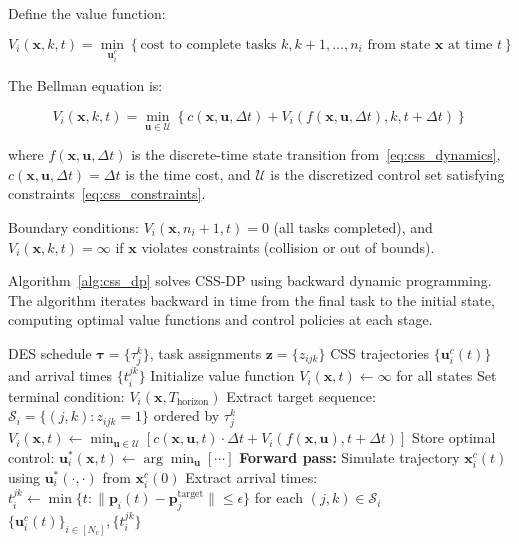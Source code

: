 \documentclass[manuscript,screen,review]{acmart}
\begin{document}
Define the value function:

\begin{equation}
V_i(\mathbf{x}, k, t) = \min_{\mathbf{u}_i^c} \left\{ \text{cost to complete tasks } k, k+1, \ldots, n_i \text{ from state } \mathbf{x} \text{ at time } t \right\}
\label{eq:css_value_function}
\end{equation}

The Bellman equation is:

\begin{equation}
V_i(\mathbf{x}, k, t) = \min_{\mathbf{u} \in \mathcal{U}} \left\{ c(\mathbf{x}, \mathbf{u}, \Delta t) + V_i(f(\mathbf{x}, \mathbf{u}, \Delta t), k, t + \Delta t) \right\}
\label{eq:css_bellman}
\end{equation}

where $f(\mathbf{x}, \mathbf{u}, \Delta t)$ is the discrete-time state
transition from~\eqref{eq:css_dynamics}, $c(\mathbf{x}, \mathbf{u}, \Delta t) = \Delta t$
is the time cost, and $\mathcal{U}$ is the discretized control set satisfying
constraints~\eqref{eq:css_constraints}.

Boundary conditions: $V_i(\mathbf{x}, n_i+1, t) = 0$ (all tasks completed),
and $V_i(\mathbf{x}, k, t) = \infty$ if $\mathbf{x}$ violates constraints
(collision or out of bounds).

Algorithm~\ref{alg:css_dp} solves CSS-DP using backward dynamic programming. 
The algorithm iterates backward in time from the final task to the initial 
state, computing optimal value functions and control policies at each stage.

\begin{algorithm}[t]
	\caption{CSS-DP: Continuous State Space Dynamic Programming}
	\label{alg:css_dp}
	\small
	\begin{algorithmic}[1]
		\Require DES schedule $\boldsymbol{\tau} = \{\tau_j^k\}$, task assignments $\mathbf{z} = \{z_{ijk}\}$
		\Ensure CSS trajectories $\{\mathbf{u}_i^c(t)\}$ and arrival times $\{t_i^{jk}\}$
		\State Initialize value function $V_i(\mathbf{x}, t) \leftarrow \infty$ for all states
		\State Set terminal condition: $V_i(\mathbf{x}, T_{\text{horizon}}) $
		\State Extract target sequence: $\mathcal{S}_i = \{(j,k): z_{ijk}=1\}$ ordered by $\tau_j^k$
		\State $V_i(\mathbf{x}, t) \leftarrow \min_{\mathbf{u} \in \mathcal{U}} \left[ c(\mathbf{x}, \mathbf{u}, t) \cdot \Delta t + V_i(f(\mathbf{x}, \mathbf{u}), t+\Delta t) \right]$
		\State Store optimal control: $\mathbf{u}_i^*(\mathbf{x}, t) \leftarrow \arg\min_{\mathbf{u}} [\cdots]$
		\EndFor
		\EndFor
		\State \textbf{Forward pass:} Simulate trajectory $\mathbf{x}_i^c(t)$ using $\mathbf{u}_i^*(\cdot, \cdot)$ from $\mathbf{x}_i^c(0)$
		\State Extract arrival times: $t_i^{jk} \leftarrow \min\{t: \|\mathbf{p}_i(t) - \mathbf{p}_j^{\text{target}}\| \leq \epsilon\}$ for each $(j,k) \in \mathcal{S}_i$
		\EndFor
		\Return $\{\mathbf{u}_i^c(t)\}_{i \in [N_c]}, \{t_i^{jk}\}$
	\end{algorithmic}
\end{algorithm}
\end{document}
